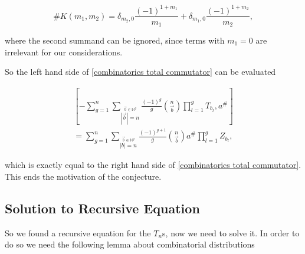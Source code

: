 \documentclass[b5paper,draft,openbib,12pt]{memoir}
\begin{document}
\begin{equation*}
\#K(m_1,m_2)= \delta_{m_2,0} \frac{(-1)^{1+m_1}}{m_1} + \delta_{m_1,0} \frac{(-1)^{1+m_2}}{m_2},
\end{equation*}

where the second summand can be ignored, since terms with \(m_1=0\) are irrelevant for our considerations.

 So the left hand side of 
\eqref{combinatorics total commutator} can be evaluated

\begin{align*}
\left[-\sum_{g=1}^n \sum_{\stackrel{\vec{b}\in\mathbb{N}^g}{|\vec{b}|=n}}\frac{(-1)^g}{g} 
\binom{n}{\vec{b}} \prod_{l=1}^g T_{b_l}, a^\#\right]\\
= \sum_{g=1}^n \sum_{\stackrel{\vec{b}\in\mathbb{N}^g}{|b|=n}} \frac{(-1)^{g+1}}{g} \binom{n}{\vec{b}}  a^\# \prod_{l=1}^g Z_{b_l},
\end{align*}

which is exactly equal to the right hand side of \eqref{combinatorics total commutator}. This ends the motivation of the conjecture.



\subsection{Solution to Recursive Equation}

So we found a recursive equation for the \(T_n\)s, now we need to solve it. 
In order to do so we need the following lemma about combinatorial distributions
\end{document}
